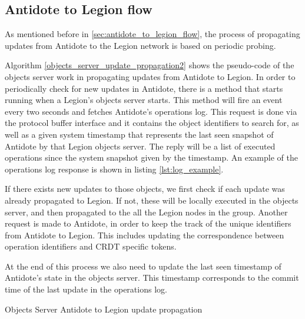 \subsection{Antidote to Legion flow}
\label{sec:legion_changes_antidote to legion flow}
As mentioned before in \ref{sec:antidote_to_legion_flow}, the process of propagating updates from Antidote to the Legion network is based on periodic probing.\par
	Algorithm \ref{objects_server_update_propagation2} shows the pseudo-code of the objects server work in propagating updates from Antidote to Legion. In order to periodically check for new updates in Antidote, there is a method that starts running when a Legion's objects server starts. This method will fire an event every two seconds and fetches Antidote's operations log. This request is done via the protocol buffer interface and it contains the object identifiers to search for, as well as a given system timestamp that represents the last seen snapshot of Antidote by that Legion objects server. The reply will be a list of executed operations since the system snapshot given by the timestamp. An example of the operations log response is shown in listing \ref{lst:log_example}.\par
	If there exists new updates to those objects, we first check if each update was already propagated to Legion. If not, these will be locally executed in the objects server, and then propagated to the all the Legion nodes in the group. Another request is made to Antidote, in order to keep the track of the unique identifiers from Antidote to Legion. This includes updating the correspondence between operation identifiers and CRDT specific tokens.\par
	At the end of this process we also need to update the last seen timestamp of Antidote's state in the objects server. This timestamp corresponds to the commit time of the last update in the operations log.
	
\begin{algorithm}[H]
\caption{Objects Server Antidote to Legion update propagation}\label{objects_server_update_propagation2}
\begin{algorithmic}[1]
          \EndIf
        \EndIf
      \EndFor
\End
\end{algorithmic}
\end{algorithm}
	
